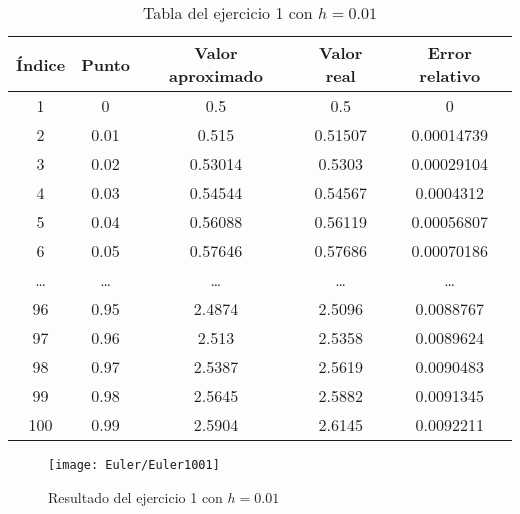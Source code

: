 \begin{table}[H]
    \begin{center}
        \begin{tabular}{ |c|c|c|c|c| }
            \hline
            Índice & Punto  & Valor aproximado & Valor real & Error relativo \\
            \hline
            \hline
            1      & 0      & 0.5              & 0.5        & 0              \\
            \hline
            2      & 0.01   & 0.515            & 0.51507    & 0.00014739     \\
            \hline
            3      & 0.02   & 0.53014          & 0.5303     & 0.00029104     \\
            \hline
            4      & 0.03   & 0.54544          & 0.54567    & 0.0004312      \\
            \hline
            5      & 0.04   & 0.56088          & 0.56119    & 0.00056807     \\
            \hline
            6      & 0.05   & 0.57646          & 0.57686    & 0.00070186     \\
            \hline
            \ldots & \ldots & \ldots           & \ldots     & \ldots         \\
            \hline
            96     & 0.95   & 2.4874           & 2.5096     & 0.0088767      \\
            \hline
            97     & 0.96   & 2.513            & 2.5358     & 0.0089624      \\
            \hline
            98     & 0.97   & 2.5387           & 2.5619     & 0.0090483      \\
            \hline
            99     & 0.98   & 2.5645           & 2.5882     & 0.0091345      \\
            \hline
            100    & 0.99   & 2.5904           & 2.6145     & 0.0092211      \\
            \hline
        \end{tabular}
    \end{center}
    \caption{Tabla del ejercicio 1 con \(h = 0.01\)}\label{tab:euler-1-0-0-1}
\end{table}

\begin{figure}[H]
    \texttt{[image: Euler/Euler1001]}
    \centering
    \caption{Resultado del ejercicio 1 con \(h = 0.01\)}\label{fig:euler-1-0-0-1}
\end{figure}


